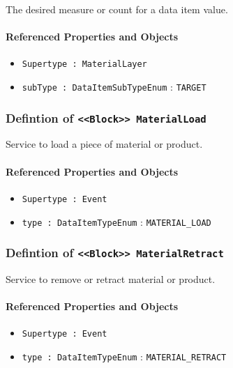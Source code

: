 \FloatBarrier

The desired measure or count for a data item value.

\FloatBarrier
\paragraph{Referenced Properties and Objects}

\begin{itemize}
\item \texttt{Supertype : MaterialLayer}

\item \texttt{subType : DataItemSubTypeEnum} : \texttt{TARGET}

\end{itemize}
\FloatBarrier
\subsubsection{Defintion of \texttt{<<Block>> MaterialLoad}}
  \label{type:MaterialLoad}

\FloatBarrier

Service to load a piece of material or product.

\FloatBarrier
\paragraph{Referenced Properties and Objects}

\begin{itemize}
\item \texttt{Supertype : Event}

\item \texttt{type : DataItemTypeEnum} : \texttt{MATERIAL_LOAD}

\end{itemize}
\FloatBarrier
\subsubsection{Defintion of \texttt{<<Block>> MaterialRetract}}
  \label{type:MaterialRetract}

\FloatBarrier

Service to remove or retract material or product.

\FloatBarrier
\paragraph{Referenced Properties and Objects}

\begin{itemize}
\item \texttt{Supertype : Event}

\item \texttt{type : DataItemTypeEnum} : \texttt{MATERIAL_RETRACT}

\end{itemize}
\FloatBarrier
